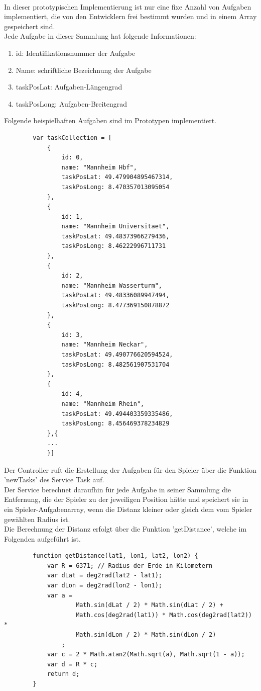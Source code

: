\\
In dieser prototypischen Implementierung ist nur eine fixe Anzahl von Aufgaben implementiert, die von den Entwicklern frei bestimmt wurden und in einem Array gespeichert sind.
\\
Jede Aufgabe in dieser Sammlung hat folgende Informationen:
\begin{enumerate}
\item id: Identifikationsnummer der Aufgabe
\item Name: schriftliche Bezeichnung der Aufgabe
\item taskPosLat: Aufgaben-Längengrad
\item taskPosLong: Aufgaben-Breitengrad
\end{enumerate}

Folgende beispielhaften Aufgaben sind im Prototypen implementiert.
\begin{lstlisting}
        var taskCollection = [
            {
                id: 0,
                name: "Mannheim Hbf",
                taskPosLat: 49.479904895467314,
                taskPosLong: 8.470357013095054
            },
            {
                id: 1,
                name: "Mannheim Universitaet",
                taskPosLat: 49.48373966279436,
                taskPosLong: 8.46222996711731
            },
            {
                id: 2,
                name: "Mannheim Wasserturm",
                taskPosLat: 49.48336089947494,
                taskPosLong: 8.477369150878872
            },
            {
                id: 3,
                name: "Mannheim Neckar",
                taskPosLat: 49.490776620594524,
                taskPosLong: 8.482561907531704
            },
            {
                id: 4,
                name: "Mannheim Rhein",
                taskPosLat: 49.494403359335486,
                taskPosLong: 8.456469378234829
            },{
            ...
            }]
\end{lstlisting}

Der Controller ruft die Erstellung der Aufgaben für den Spieler über die Funktion 'newTasks' des Service Task auf.
\\
Der Service berechnet daraufhin für jede Aufgabe in seiner Sammlung die Entfernung, die der Spieler zu der jeweiligen Position hätte und speichert sie in ein Spieler-Aufgabenarray, wenn die Distanz kleiner oder gleich dem vom Spieler gewählten Radius ist.
\\
Die Berechnung der Distanz erfolgt über die Funktion 'getDistance', welche im Folgenden aufgeführt ist.
\begin{lstlisting}
        function getDistance(lat1, lon1, lat2, lon2) {
            var R = 6371; // Radius der Erde in Kilometern
            var dLat = deg2rad(lat2 - lat1);
            var dLon = deg2rad(lon2 - lon1);
            var a =
                    Math.sin(dLat / 2) * Math.sin(dLat / 2) +
                    Math.cos(deg2rad(lat1)) * Math.cos(deg2rad(lat2)) *
                    Math.sin(dLon / 2) * Math.sin(dLon / 2)
                ;
            var c = 2 * Math.atan2(Math.sqrt(a), Math.sqrt(1 - a));
            var d = R * c;
            return d;
        }
\end{lstlisting}
\cite{Movable-Type}

